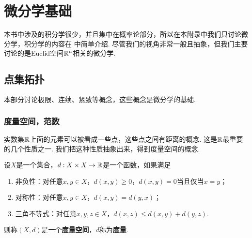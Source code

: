 \chapter{微分学基础}\label{chap:calculus}
本书中涉及的积分学很少，并且集中在概率论部分，所以在本附录中我们只讨论微分学，积分学的内容在 中简单介绍. 尽管我们的视角非常一般且抽象，但我们主要讨论的是Euclid空间$\mathbb{R}^n$相关的微分学. 

\section{点集拓扑}\label{sec:topology}
本部分讨论极限、连续、紧致等概念，这些概念是微分学的基础. 

\subsection{度量空间，范数}\label{subsec:metric-norm}
实数集$\mathbb{R}$上面的元素可以被看成一些点，这些点之间有距离的概念. 这是$\mathbb{R}$最重要的几个性质之一. 我们把这种性质抽象出来，得到度量空间的概念. 

\begin{definition}[度量空间]
设$X$是一个集合，$d:X\times X\to\mathbb{R}$是一个函数，如果满足
\begin{enumerate}
    \item 非负性：对任意$x,y\in X$，$d(x,y)\geq 0$，$d(x,y)=0$当且仅当$x=y$；
    \item 对称性：对任意$x,y\in X$，$d(x,y)=d(y,x)$；
    \item 三角不等式：对任意$x,y,z\in X$，$d(x,z)\leq d(x,y)+d(y,z)$. 
\end{enumerate}
则称$(X,d)$是一个\textbf{度量空间}，$d$称为\textbf{度量}. 
\end{definition}

